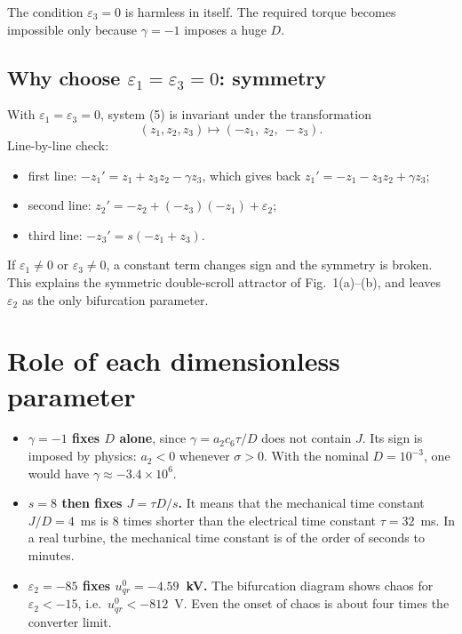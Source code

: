 \documentclass[11pt,a4paper]{article}
\begin{document}
The condition $\varepsilon_3=0$ is harmless in itself. The required torque becomes impossible only because $\gamma=-1$ imposes a huge $D$.

\subsection{Why choose $\varepsilon_1=\varepsilon_3=0$: symmetry}
With $\varepsilon_1=\varepsilon_3=0$, system (5) is invariant under the transformation
\[
(z_1,z_2,z_3)\longmapsto(-z_1,\ z_2,\ -z_3).
\]
Line-by-line check:
\begin{itemize}
\item first line: $-z_1'=z_1+z_3z_2-\gamma z_3$, which gives back $z_1'=-z_1-z_3z_2+\gamma z_3$;
\item second line: $z_2'=-z_2+(-z_3)(-z_1)+\varepsilon_2$;
\item third line: $-z_3'=s(-z_1+z_3)$.
\end{itemize}
If $\varepsilon_1\neq0$ or $\varepsilon_3\neq0$, a constant term changes sign and the symmetry is broken. This explains the symmetric double-scroll attractor of Fig.~1(a)--(b), and leaves $\varepsilon_2$ as the only bifurcation parameter.

\section{Role of each dimensionless parameter}
\begin{itemize}
\item \textbf{$\gamma=-1$ fixes $D$ alone}, since $\gamma=a_2c_6\tau/D$ does not contain $J$. Its sign is imposed by physics: $a_2<0$ whenever $\sigma>0$. With the nominal $D=10^{-3}$, one would have $\gamma\approx-3.4\times10^{6}$.
\item \textbf{$s=8$ then fixes $J=\tau D/s$.} It means that the mechanical time constant $J/D=4$~ms is 8 times shorter than the electrical time constant $\tau=32$~ms. In a real turbine, the mechanical time constant is of the order of seconds to minutes.
\item \textbf{$\varepsilon_2=-85$ fixes $u^0_{qr}=-4.59$~kV.} The bifurcation diagram shows chaos for $\varepsilon_2<-15$, i.e.\ $u^0_{qr}<-812$~V. Even the onset of chaos is about four times the converter limit.
\end{itemize}
\end{document}
